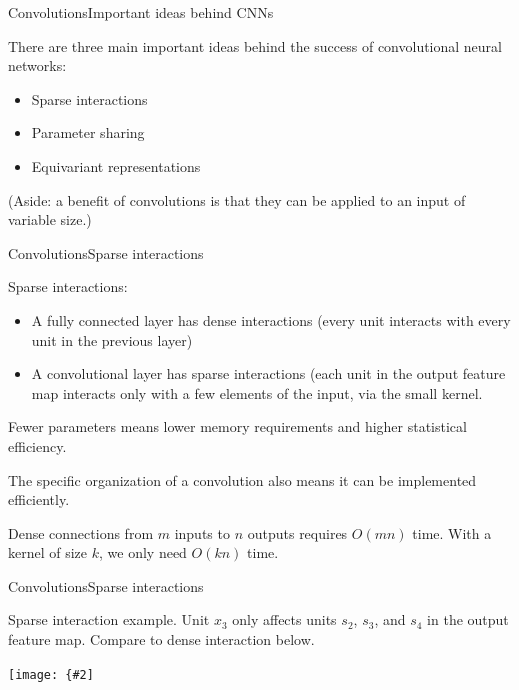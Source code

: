 \documentclass[aspectratio=169]{beamer}
\newcommand{\myfig}[3]{\centerline{\texttt{[image: \{\#2]}}}
\begin{document}
\begin{frame}{Convolutions}{Important ideas behind CNNs}

There are three main important ideas behind the success of
convolutional neural networks:
\begin{itemize}
\item Sparse interactions
\item Parameter sharing
\item Equivariant representations
\end{itemize}

(Aside: a benefit of convolutions is that they can be applied to an
input of variable size.)

\end{frame}


\begin{frame}{Convolutions}{Sparse interactions}

  \alert{Sparse interactions}:
  \begin{itemize}
    \item A fully connected layer has \alert{dense}
interactions (every unit interacts with every unit in the previous
layer)
\item A convolutional layer has \alert{sparse} interactions (each
unit in the output feature map interacts only with a few elements of
the input, via the small kernel.
  \end{itemize}

  \medskip
  
  Fewer parameters means \alert{lower memory requirements} and
  \alert{higher statistical efficiency}.

  \medskip
  
  The specific organization of a convolution also means it can be
  implemented efficiently.

  \medskip

  Dense connections from $m$ inputs to $n$ outputs requires $O(mn)$
  time.  With a kernel of size $k$, we only need $O(kn)$ time.

\end{frame}


\begin{frame}{Convolutions}{Sparse interactions}

Sparse interaction example. Unit $x_3$ only affects units
$s_2$, $s_3$, and $s_4$ in the output feature map.
Compare to dense interaction below.

\myfig{2in}{goodfellow-fig9-2}{Goodfellow et al. (2016), Figure 9.2}

\end{frame}
\end{document}

